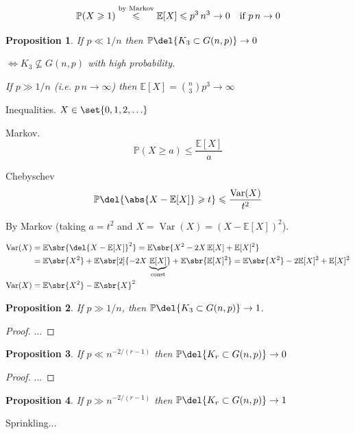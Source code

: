 \documentclass[english, dark, index]{Iart}
\newtheorem{proposition}{Proposition}[chapter]
\DeclareMathOperator{\Var}{Var}
\begin{document}
	\[ \mathbb{P}(X\geqslant 1)\overset{\textup{by Markov}}{\leqslant} \mathbb{E}[X]\leqslant p^{3}\,n^{3}\to 0\quad\text{if }p\,n\to 0 \]
	
	\begin{proposition}
		If $ p\ll 1/n $ then $ \mathbb{P}\del{K_3\subset G(n,p)}\to 0 $
		
		$ \iff K_3\nsubseteq G(n,p) $ with high probability.
		
		If $ p\gg 1/n $ (i.e. $ p\,n\to\infty $) then $ \mathbb{E}[X]=\binom{n}{3}p^{3}\to\infty $
	\end{proposition}

	Inequalities. $ X\in\set{0,1,2,\ldots} $
	
	Markov. \[ \mathbb{P}(X\geqslant a)\leqslant \dfrac{\mathbb{E}[X]}{a} \]
	
	Chebyschev \[ \mathbb{P}\del{\abs{X-\mathbb{E}[X]}\geqslant t}\leqslant \dfrac{\Var(X)}{t^{2}} \]
	
	By Markov (taking $ a=t^{2} $ and $ X=\Var(X)=(X-\mathbb{E}[X])^{2} $).
	
	\begin{align*}
		\Var(X)&=\mathbb{E}\sbr{\del{X-\mathbb{E}[X]}^{2}}=\mathbb{E}\sbr{X^{2}-2X\,\mathbb{E}[X]+\mathbb{E}[X]^{2}}\\
		&=\mathbb{E}\sbr{X^{2}}+\mathbb{E}\sbr[2]{-2X\,\underbrace{\mathbb{E}[X]}_{\textup{const}}}+\mathbb{E}\sbr{\mathbb{E}[X]^{2}}=\mathbb{E}\sbr{X^{2}}-2\mathbb{E}[X]^{2}+\mathbb{E}[X]^{2}\\
		\Var(X)&=\mathbb{E}\sbr{X^{2}}-\mathbb{E}\sbr{X}^{2}
	\end{align*}

	\begin{proposition}
		If $ p\gg 1/n $, then $ \mathbb{P}\del{K_3\subset G(n,p)}\to1 $.
	\end{proposition}
	\begin{proof}
		...
	\end{proof}
	
	\begin{proposition}
		If $ p\ll n^{-2/(r-1)} $ then $ \mathbb{P}\del{K_r\subset G(n,p)}\to0 $
	\end{proposition}
	\begin{proof}
		...
	\end{proof}

	\begin{proposition}
		If $ p\gg n^{-2/(r-1)} $ then $ \mathbb{P}\del{K_r\subset G(n,p)}\to1 $
	\end{proposition}

	Sprinkling...
	
	
	
\end{document}
